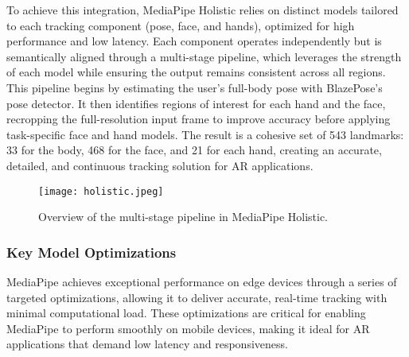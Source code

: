 To achieve this integration, MediaPipe Holistic relies on distinct models tailored to each tracking component (pose, face, and hands), optimized for high performance and low latency.
Each component operates independently but is semantically aligned through a multi-stage pipeline, which leverages the strength of each model while ensuring the output remains consistent across all regions. This pipeline begins by estimating the user’s full-body pose with BlazePose’s pose detector.
It then identifies regions of interest for each hand and the face, recropping the full-resolution input frame to improve accuracy before applying task-specific face and hand models.
The result is a cohesive set of 543 landmarks: 33 for the body, 468 for the face, and 21 for each hand, creating an accurate, detailed, and continuous tracking solution for AR applications.
\begin{figure}[!h]
    \centering
    \texttt{[image: holistic.jpeg]}
    \caption{Overview of the multi-stage pipeline in MediaPipe Holistic.}
    \vspace{0.1cm}
    \label{fig:holisticArchitecture}
\end{figure}

\subsubsection{Key Model Optimizations}


MediaPipe achieves exceptional performance on edge devices through a series of targeted optimizations, allowing it to deliver accurate, real-time tracking with minimal computational load.
These optimizations are critical for enabling MediaPipe to perform smoothly on mobile devices, making it ideal for AR applications that demand low latency and responsiveness.


